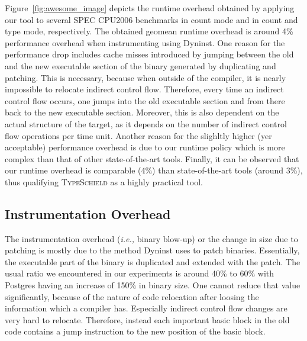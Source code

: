 Figure~\ref{fig:awesome_image} depicts the runtime overhead obtained by applying our tool to several SPEC CPU2006 benchmarks
in count mode and in count and type mode, respectively.
The obtained geomean runtime overhead is around 4\% performance overhead when instrumenting using Dyninst. 
One reason for the performance drop includes cache misses introduced by jumping between the old and the new executable section 
of the binary generated by duplicating and patching. This is necessary, because when
outside of the compiler, it is nearly impossible to relocate indirect control flow. Therefore, 
every time an indirect control flow occurs, one jumps into the old executable section and from 
there back to the new executable section. Moreover, this is also dependent on the actual structure 
of the target, as it depends on the number of indirect control flow operations per time unit.
Another reason for the slighltly higher (yer acceptable) performance overhead is due to our
runtime policy which is more complex than that of other state-of-the-art tools.
Finally, it can be observed that our runtime overhead is comparable (4\%) than state-of-the-art tools (around 3\%), 
thus qualifying \textsc{TypeSchield} as a highly practical tool.


\subsection{Instrumentation Overhead}
\label{section:typeshieldoverheadinstrumentation}


The instrumentation overhead (\textit{i.e.,} binary blow-up) or the change in size due to patching is mostly due to the method Dyninst uses to patch binaries. 
Essentially, the executable part of the binary is duplicated and extended with the patch. The usual ratio we encountered in our experiments is 
around 40\% to 60\% with Postgres having an increase of 150\% in binary size. One cannot reduce that 
value significantly, because of the nature of code relocation after loosing the information which a compiler has. Especially indirect control flow 
changes are very hard to relocate. Therefore, instead each important basic block in the old code contains a jump instruction to the new position of the basic block.

